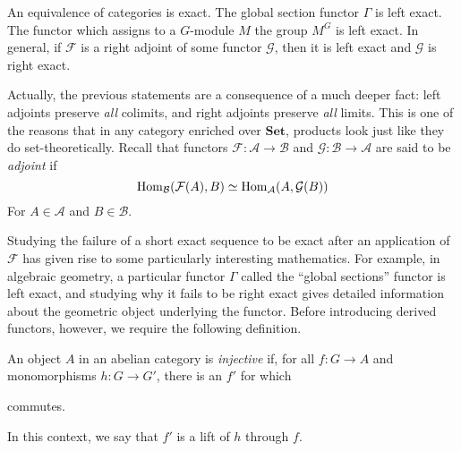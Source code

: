 \begin{example}
    An equivalence of categories is exact. The global section functor $\Gamma$
    is left exact. The functor which assigns to a $G$-module $M$ the group $M^G$
    is left exact. In general, if $\mathcal{F}$ is a right adjoint of some
    functor $\mathcal{G}$, then it is left exact and $\mathcal{G}$ is right
    exact.

\end{example}

\begin{remark}
    Actually, the previous statements are a consequence of a much deeper fact:
    left adjoints preserve \textit{all} colimits, and right adjoints preserve
    \textit{all} limits. This is one of the reasons that in any category
    enriched over $\mathbf{Set}$, products look just like they do
    set-theoretically. Recall that functors $\mathcal{F} : \mathcal{A} \to
    \mathcal{B}$ and $\mathcal{G} : \mathcal{B} \to \mathcal{A}$ are said to be
    \textit{adjoint} if
    \[
        \operatorname{Hom}_\mathcal{B}(\mathcal{F}(A), B) \simeq \operatorname{Hom}_\mathcal{A}(A,
        \mathcal{G}(B))
    \]
    For $A \in \mathcal{A}$ and $B \in \mathcal{B}$.
\end{remark}

Studying the failure of a short exact sequence to be exact after an application
of $\mathcal{F}$ has given rise to some particularly interesting mathematics.
For example, in algebraic geometry, a particular functor $\Gamma$ called the
``global sections'' functor is left exact, and studying why it fails to be right
exact gives detailed information about the geometric object underlying the
functor. Before introducing derived functors, however, we require the following
definition.

\begin{definition}
    An object $A$ in an abelian category is \textit{injective} if, for all $f :
    G \to A$ and monomorphisms $h : G \to G'$, there is an $f'$ for which
    \begin{center}
        \quad commutes.
    \end{center}
    In this context, we say that $f'$ is a lift of $h$ through $f$.
\end{definition}

